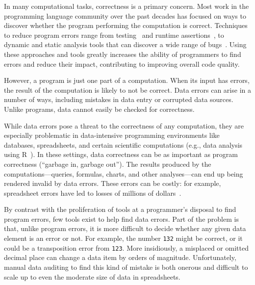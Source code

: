 In many computational tasks, correctness is a primary concern. Most
work in the programming language community over the past decades has
focused on ways to discover whether the program performing the computation is
correct. Techniques to reduce program errors range from
testing~\cite{unittesting,fuzztesting} and runtime
assertions~\cite{samanderansthing,others}, to dynamic and static
analysis tools that can discover a wide range of
bugs~\cite{valgrind,dawsonthing,otherpcmemberfoo}. Using these
approaches and tools greatly increases the ability of programmers to
find errors and reduce their impact, contributing to improving overall
code quality.

However, a program is just one part of a computation. When its input
has errors, the result of the computation is likely to not be
correct. Data errors can arise in a number of ways, including mistakes
in data entry or corrupted data sources. Unlike programs, data cannot
easily be checked for correctness.


While data errors pose a threat to the correctness of any computation,
they are especially problematic in data-intensive programming
environments like databases, spreadsheets, and certain scientific
computations (e.g., data analysis using R~\cite{FIXME}). In these settings,
data correctness can be as important as program correctness (``garbage
in, garbage out''). The results produced by the
computations---queries, formulas, charts, and other analyses---can end
up being rendered invalid by data errors. These errors can be costly:
for example, spreadsheet errors have led to losses of millions of
dollars~\cite{FIXME}.




By contrast with the proliferation of tools at a programmer's disposal
to find program errors, few tools exist to help find data errors. Part
of the problem is that, unlike program errors, it is more difficult to
decide whether any given data element is an error or not. For example,
the number \texttt{132} might be correct, or it could be a
transposition error from \texttt{123}. More insidiously, a misplaced
or omitted decimal place can change a data item by orders of
magnitude. Unfortunately, manual data auditing to find this kind of
mistake is both onerous and difficult to scale up to even the moderate
size of data in spreadsheets.


